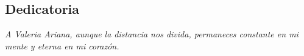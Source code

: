 \newpage

\thispagestyle{empty} %

\vspace*{\fill} %

\begin{flushright} %

\begin{minipage}{0.5\textwidth} %
\raggedleft %
\section*{Dedicatoria}


\textit{ A Valeria Ariana, aunque la distancia nos divida, permaneces constante en mi mente y eterna en mi corazón. }
\end{minipage}
\end{flushright}

\vfill %
\newpage

